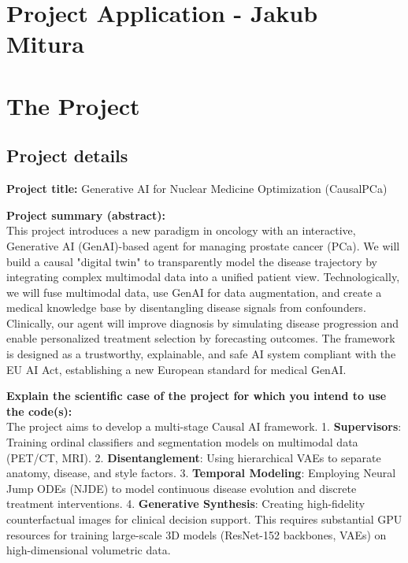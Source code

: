 \documentclass[11pt, a4paper]{article}
\begin{document}
\section*{Project Application - Jakub Mitura}

\section*{The Project}

\subsection*{Project details}

\noindent\textbf{Project title:} Generative AI for Nuclear Medicine Optimization (CausalPCa)

\vspace{0.5em}
\noindent\textbf{Project summary (abstract):} \\
This project introduces a new paradigm in oncology with an interactive, Generative AI (GenAI)-based agent for managing prostate cancer (PCa). We will build a causal "digital twin" to transparently model the disease trajectory by integrating complex multimodal data into a unified patient view. Technologically, we will fuse multimodal data, use GenAI for data augmentation, and create a medical knowledge base by disentangling disease signals from confounders. Clinically, our agent will improve diagnosis by simulating disease progression and enable personalized treatment selection by forecasting outcomes. The framework is designed as a trustworthy, explainable, and safe AI system compliant with the EU AI Act, establishing a new European standard for medical GenAI.

\vspace{0.5em}
\noindent\textbf{Explain the scientific case of the project for which you intend to use the code(s):} \\
The project aims to develop a multi-stage Causal AI framework.
1. \textbf{Supervisors}: Training ordinal classifiers and segmentation models on multimodal data (PET/CT, MRI).
2. \textbf{Disentanglement}: Using hierarchical VAEs to separate anatomy, disease, and style factors.
3. \textbf{Temporal Modeling}: Employing Neural Jump ODEs (NJDE) to model continuous disease evolution and discrete treatment interventions.
4. \textbf{Generative Synthesis}: Creating high-fidelity counterfactual images for clinical decision support.
This requires substantial GPU resources for training large-scale 3D models (ResNet-152 backbones, VAEs) on high-dimensional volumetric data.
\end{document}
